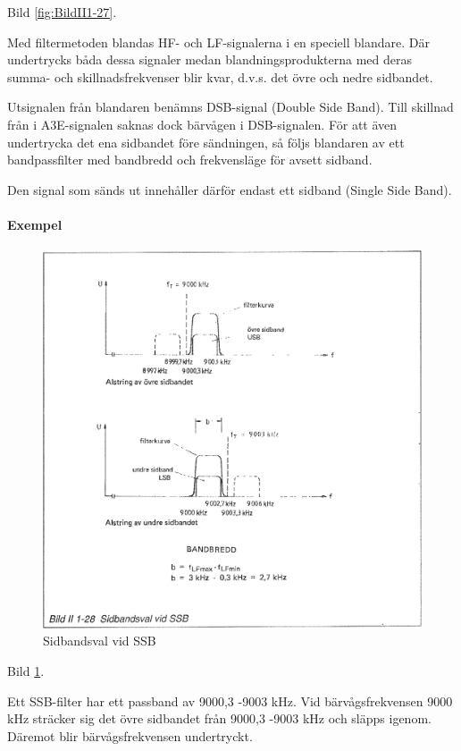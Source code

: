 Bild \ref{fig:BildII1-27}.

Med filtermetoden blandas HF- och LF-signalerna i en speciell blandare. Där
undertrycks båda dessa signaler medan blandningsprodukterna med deras summa-
och skillnadsfrekvenser blir kvar, d.v.s. det övre och nedre sidbandet.

Utsignalen från blandaren benämns DSB-signal (Double Side Band). Till skillnad
från i A3E-signalen saknas dock bärvågen i DSB-signalen. För att även
undertrycka det ena sidbandet före sändningen, så följs blandaren av ett
bandpassfilter med bandbredd och frekvensläge för avsett sidband.

Den signal som sänds ut innehåller därför endast ett sidband (Single Side Band).

\paragraph{Exempel}

\begin{figure}
\includegraphics[width=\textwidth]{images/bild_2_1-28}
\caption{Sidbandsval vid SSB}
\label{fig:BildII1-28}
\end{figure}

Bild \ref{fig:BildII1-28}.

Ett SSB-filter har ett passband av 9000,3 -9003 kHz. Vid bärvågsfrekvensen 9000 kHz
sträcker sig det övre sidbandet från 9000,3 -9003 kHz och släpps igenom. Däremot
blir bärvågsfrekvensen undertryckt.

